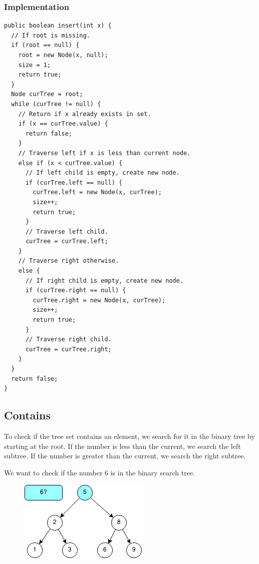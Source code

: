 \documentclass[11pt,oneside]{book}
\makeatletter
\def\maxwidth#1{\ifdim\Gin@nat@width>#1 #1\else\Gin@nat@width\fi}
\makeatother
\begin{document}
\subsubsection{Implementation}

\begin{lstlisting}
public boolean insert(int x) {
  // If root is missing.
  if (root == null) {
    root = new Node(x, null);
    size = 1;
    return true;
  }
  Node curTree = root;
  while (curTree != null) {
    // Return if x already exists in set.
    if (x == curTree.value) {
      return false;
    }
    // Traverse left if x is less than current node.
    else if (x < curTree.value) {
      // If left child is empty, create new node.
      if (curTree.left == null) {
        curTree.left = new Node(x, curTree);
        size++;
        return true;
      }
      // Traverse left child.
      curTree = curTree.left;
    }
    // Traverse right otherwise.
    else {
      // If right child is empty, create new node.
      if (curTree.right == null) {
        curTree.right = new Node(x, curTree);
        size++;
        return true;
      }
      // Traverse right child.
      curTree = curTree.right;
    }
  }
  return false;
}
\end{lstlisting}

\subsection{Contains}

To check if the tree set contains an element, we search for it in the binary tree by starting at the root. If the number is less than the current, we search the left subtree. If the number is greater than the current, we search the right subtree.

We want to check if the number 6 is in the binary search tree.

\vspace{5px}\begin{figure}[H]\centering
        \includegraphics[width=0.66\maxwidth{\textwidth}]{bstcontains.png}
        \end{figure}
\end{document}
